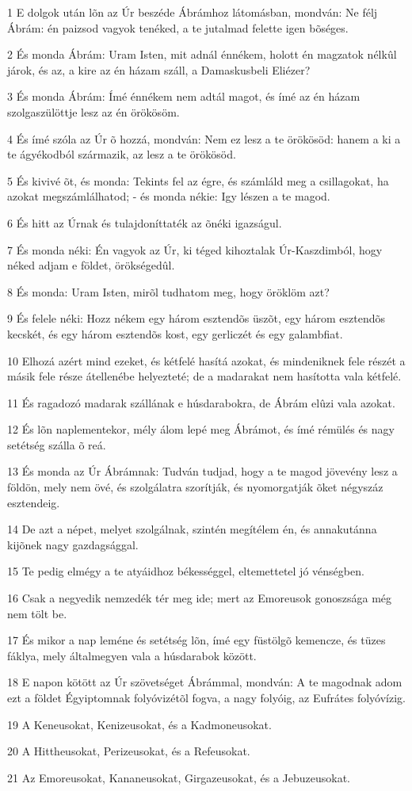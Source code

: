 \par 1 E dolgok után lõn az Úr beszéde Ábrámhoz látomásban, mondván: Ne félj Ábrám: én paizsod vagyok tenéked, a te jutalmad felette igen bõséges.
\par 2 És monda Ábrám: Uram Isten, mit adnál énnékem, holott én magzatok nélkûl járok, és az, a kire az én házam száll, a Damaskusbeli Eliézer?
\par 3 És monda Ábrám: Ímé énnékem nem adtál magot, és ímé az én házam szolgaszülöttje lesz az én örökösöm.
\par 4 És ímé szóla az Úr õ hozzá, mondván: Nem ez lesz a te örökösöd: hanem a ki a te ágyékodból származik, az lesz a te örökösöd.
\par 5 És kivivé õt, és monda: Tekints fel az égre, és számláld meg a csillagokat, ha azokat megszámlálhatod; - és monda nékie: Igy lészen a te magod.
\par 6 És hitt az Úrnak és tulajdoníttaték az õnéki igazságul.
\par 7 És monda néki: Én vagyok az Úr, ki téged kihoztalak Úr-Kaszdimból, hogy néked adjam e földet, örökségedûl.
\par 8 És monda: Uram Isten, mirõl tudhatom meg, hogy öröklöm azt?
\par 9 És felele néki: Hozz nékem egy három esztendõs üszõt, egy három esztendõs kecskét, és egy három esztendõs kost, egy gerliczét és egy galambfiat.
\par 10 Elhozá azért mind ezeket, és kétfelé hasítá azokat, és mindeniknek fele részét a másik fele része átellenébe helyezteté; de a madarakat nem hasította vala kétfelé.
\par 11 És ragadozó madarak szállának e húsdarabokra, de Ábrám elûzi vala azokat.
\par 12 És lõn naplementekor, mély álom lepé meg Ábrámot, és ímé rémülés és nagy setétség szálla õ reá.
\par 13 És monda az Úr Ábrámnak: Tudván tudjad, hogy a te magod jövevény lesz a földön, mely nem övé, és szolgálatra szorítják, és nyomorgatják õket négyszáz esztendeig.
\par 14 De azt a népet, melyet szolgálnak, szintén megítélem én, és annakutánna kijõnek nagy gazdagsággal.
\par 15 Te pedig elmégy a te atyáidhoz békességgel, eltemettetel jó vénségben.
\par 16 Csak a negyedik nemzedék tér meg ide; mert az Emoreusok gonoszsága még nem tölt be.
\par 17 És mikor a nap leméne és setétség lõn, ímé egy füstölgõ kemencze, és tüzes fáklya, mely általmegyen vala a húsdarabok között.
\par 18 E napon kötött az Úr szövetséget Ábrámmal, mondván: A te magodnak adom ezt a földet Égyiptomnak folyóvizétõl fogva, a nagy folyóig, az Eufrátes folyóvízig.
\par 19 A Keneusokat, Kenizeusokat, és a Kadmoneusokat.
\par 20 A Hittheusokat, Perizeusokat, és a Refeusokat.
\par 21 Az Emoreusokat, Kananeusokat, Girgazeusokat, és a Jebuzeusokat.

